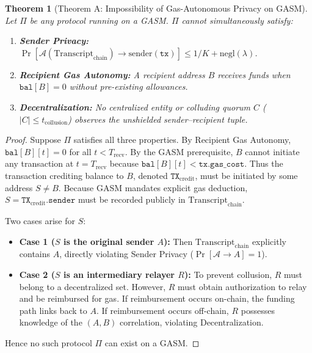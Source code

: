 \documentclass[sigconf,nonacm]{acmart}
\newtheorem{theorem}{Theorem}
\begin{document}
\begin{theorem}[Theorem A: Impossibility of Gas-Autonomous Privacy on GASM]\label{thm:impossibility}
Let $\Pi$ be any protocol running on a GASM. $\Pi$ cannot simultaneously satisfy:
\begin{enumerate}
    \item \textbf{Sender Privacy:} $\Pr[\mathcal{A}(\text{Transcript}_{\text{chain}}) \to \text{sender}(\mathtt{tx})] \le 1/K + \text{negl}(\lambda)$.
    \item \textbf{Recipient Gas Autonomy:} A recipient address $B$ receives funds when $\mathtt{bal}[B] = 0$ without pre-existing allowances.
    \item \textbf{Decentralization:} No centralized entity or colluding quorum $C$ ($|C| \le t_{\text{collusion}}$) observes the unshielded sender--recipient tuple.
\end{enumerate}
\end{theorem}

\begin{proof}
Suppose $\Pi$ satisfies all three properties. By Recipient Gas Autonomy, $\mathtt{bal}[B][t] = 0$ for all $t < T_{\text{recv}}$. By the GASM prerequisite, $B$ cannot initiate any transaction at $t = T_{\text{recv}}$ because $\mathtt{bal}[B][t] < \mathtt{tx.gas\_cost}$. Thus the transaction crediting balance to $B$, denoted $\mathtt{TX}_{\text{credit}}$, must be initiated by some address $S \neq B$. Because GASM mandates explicit gas deduction, $S = \mathtt{TX}_{\text{credit}}.\mathtt{sender}$ must be recorded publicly in $\text{Transcript}_{\text{chain}}$.

Two cases arise for $S$:
\begin{itemize}
    \item \textbf{Case 1 ($S$ is the original sender $A$):} Then $\text{Transcript}_{\text{chain}}$ explicitly contains $A$, directly violating Sender Privacy ($\Pr[\mathcal{A} \to A] = 1$).
    \item \textbf{Case 2 ($S$ is an intermediary relayer $R$):} To prevent collusion, $R$ must belong to a decentralized set. However, $R$ must obtain authorization to relay and be reimbursed for gas. If reimbursement occurs on-chain, the funding path links back to $A$. If reimbursement occurs off-chain, $R$ possesses knowledge of the $(A, B)$ correlation, violating Decentralization.
\end{itemize}
Hence no such protocol $\Pi$ can exist on a GASM.
\end{proof}
\end{document}

